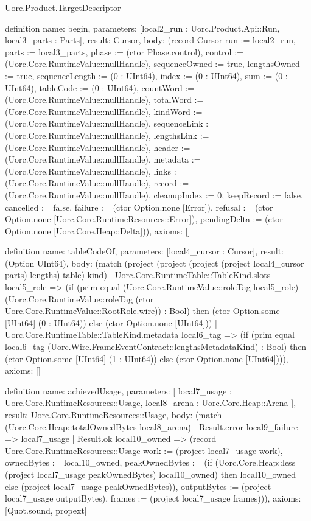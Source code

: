 \begin{lexlean}{Uorc.Product.TargetDescriptor}
\begin{semanticmodule}
definition{
  name: begin,
  parameters: [local2_run : Uorc.Product.Api::Run, local3_parts : Parts],
  result: Cursor,
  body: (record Cursor {run := local2_run, parts := local3_parts, phase := (ctor Phase.control), control := (Uorc.Core.RuntimeValue::nullHandle), sequenceOwned := true, lengthsOwned := true, sequenceLength := (0 : UInt64), index := (0 : UInt64), sum := (0 : UInt64), tableCode := (0 : UInt64), countWord := (Uorc.Core.RuntimeValue::nullHandle), totalWord := (Uorc.Core.RuntimeValue::nullHandle), kindWord := (Uorc.Core.RuntimeValue::nullHandle), sequenceLink := (Uorc.Core.RuntimeValue::nullHandle), lengthsLink := (Uorc.Core.RuntimeValue::nullHandle), header := (Uorc.Core.RuntimeValue::nullHandle), metadata := (Uorc.Core.RuntimeValue::nullHandle), links := (Uorc.Core.RuntimeValue::nullHandle), record := (Uorc.Core.RuntimeValue::nullHandle), cleanupIndex := 0, keepRecord := false, cancelled := false, failure := (ctor Option.none [Error]), refusal := (ctor Option.none [Uorc.Core.RuntimeResources::Error]), pendingDelta := (ctor Option.none [Uorc.Core.Heap::Delta])}),
  axioms: []
}

definition{
  name: tableCodeOf,
  parameters: [local4_cursor : Cursor],
  result: (Option UInt64),
  body: (match (project (project (project (project local4_cursor parts) lengths) table) kind)
    | Uorc.Core.RuntimeTable::TableKind.slots local5_role => (if (prim equal (Uorc.Core.RuntimeValue::roleTag local5_role) (Uorc.Core.RuntimeValue::roleTag (ctor Uorc.Core.RuntimeValue::RootRole.wire)) : Bool) then (ctor Option.some [UInt64] (0 : UInt64)) else (ctor Option.none [UInt64]))
    | Uorc.Core.RuntimeTable::TableKind.metadata local6_tag => (if (prim equal local6_tag (Uorc.Wire.FrameEventContract::lengthsMetadataKind) : Bool) then (ctor Option.some [UInt64] (1 : UInt64)) else (ctor Option.none [UInt64]))),
  axioms: []
}

definition{
  name: achievedUsage,
  parameters: [
    local7_usage : Uorc.Core.RuntimeResources::Usage,
    local8_arena : Uorc.Core.Heap::Arena
  ],
  result: Uorc.Core.RuntimeResources::Usage,
  body: (match (Uorc.Core.Heap::totalOwnedBytes local8_arena)
    | Result.error local9_failure => local7_usage
    | Result.ok local10_owned => (record Uorc.Core.RuntimeResources::Usage {work := (project local7_usage work), ownedBytes := local10_owned, peakOwnedBytes := (if (Uorc.Core.Heap::less (project local7_usage peakOwnedBytes) local10_owned) then local10_owned else (project local7_usage peakOwnedBytes)), outputBytes := (project local7_usage outputBytes), frames := (project local7_usage frames)})),
  axioms: [Quot.sound, propext]
}


\end{semanticmodule}
\end{lexlean}

